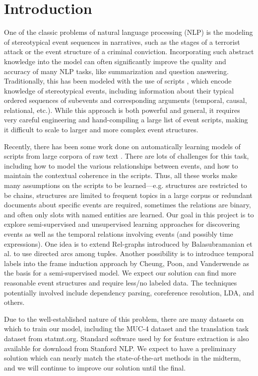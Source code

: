 \section{Introduction}
One of the classic problems of natural language processing (NLP) is the modeling of stereotypical event sequences in narratives, such as the stages of a terrorist attack or the event structure of a criminal conviction. Incorporating such abstract knowledge into the model can often significantly improve the quality and accuracy of many NLP tasks, like summarization and question answering. Traditionally, this has been modeled with the use of scripts \cite{SA77}, which encode knowledge of stereotypical events, including information about their typical ordered sequences of subevents and corresponding arguments (temporal, causal, relational, etc.). While this approach is both powerful and general, it requires very careful engineering and hand-compiling a large list of event scripts, making it difficult to scale to larger and more complex event structures.

Recently, there has been some work done on automatically learning models of scripts from large corpora of raw text \cite{B08, C13, CJ09schema, CJ08chain}. There are lots of challenges for this task, including how to model the various relationships between events, and how to maintain the contextual coherence in the scripts. Thus, all these works make many assumptions on the scripts to be learned---e.g. structures are restricted to be chains, structures are limited to frequent topics in a large corpus or redundant documents about specific events are required, sometimes the relations are binary, and often only slots with named entities are learned. Our goal in this project is to explore semi-supervised and unsupervised learning approaches for discovering events as well as the temporal relations involving events (and possibly time expressions). One idea is to extend Rel-graphs introduced by Balasubramanian et al. \cite{BSME13} to use directed arcs among tuples. Another possibility is to introduce temporal labels into the frame induction approach by Cheung, Poon, and Vanderwende \cite{CPV13} as the basis for a semi-supervised model. We expect our solution can find more reasonable event structures and require less/no labeled data. The techniques potentially involved include dependency parsing, coreference resolution, LDA, and others.

Due to the well-established nature of this problem, there are many datasets on which to train our model, including the MUC-4 dataset and the translation task dataset from statmt.org. Standard software used by for feature extraction is also available for download from Stanford NLP. We expect to have a preliminary solution which can nearly match the state-of-the-art methods in the midterm, and we will continue to improve our solution until the final.